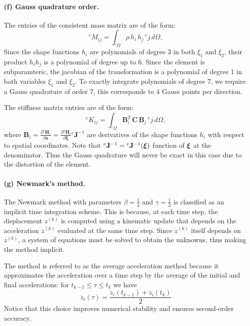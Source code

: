\documentclass[12pt]{article}
\begin{document}
\paragraph*{(f) Gauss quadrature order.} The entries of the consistent mass matrix are of the form:
\[
	{}^eM_{ij} = \int_{{}^e\Omega} \rho\, h_i\, h_j\, {}^ej\, d\Omega,
\]
Since the shape functions \( h_i \) are polynomials of degree 3 in both \( \xi_1 \) and \( \xi_2 \), their product \( h_i h_j \) is a polynomial of degree up to 6. Since the element is subparamteric, the jacobian of the transformation is a polynomial of degree 1 in both variables \( \xi_1 \) and \( \xi_2 \). To exactly integrate polynomials of degree \( 7 \), we require a Gauss quadrature of order $7$, this corresponds to $4$ Gauss points per direction.

The stiffness matrix entries are of the form:
\[
	{}^eK_{ij} = \int_{{}^e\Omega} \boldsymbol{B}_i^T\, \mathbf{C}\, \boldsymbol{B}_j\,{}^ej\, d\Omega,
\]
where \( \boldsymbol{B}_i =\frac{\partial {}^e\mathbf H_i}{\partial \mathbf x}=\frac{\partial {}^a\mathbf H_i}{\partial \mathbf \xi} {}^e\mathbf J^{-1}\) are derivatives of the shape functions \( h_i \) with respect to spatial coordinates. Note that ${}^e\mathbf J^{-1}={}^e\mathbf J^{-1}(\boldsymbol\xi)$ function of $\boldsymbol\xi$ at the denominator. Thus the Gauss quadrature will never be exact in this case due to the distortion of the element.

\paragraph*{(g) Newmark's method.}  The Newmark method with parameters $\beta = \frac{1}{4}$ and $\gamma = \frac{1}{2}$ is classified as an implicit time integration scheme. This is because, at each time step, the displacement $z^{(k)}$ is computed using a kinematic update that depends on the acceleration $\ddot{z}^{(k)}$ evaluated at the same time step. Since $\ddot{z}^{(k)}$ itself depends on $z^{(k)}$, a system of equations must be solved to obtain the unknowns, thus making the method implicit.

The method is referred to as the average acceleration method because it approximates the acceleration over a time step by the average of the initial and final accelerations: for $t_{k-1}\leq \tau \leq t_{k}$ we have
\[
	\ddot{z}_i(\tau) = \frac{\ddot{z}_i(t_{k-1}) + \ddot{z}_i(t_k)}{2}
\]
Notice that this choice improves numerical stability and ensures second-order accuracy.
\end{document}
